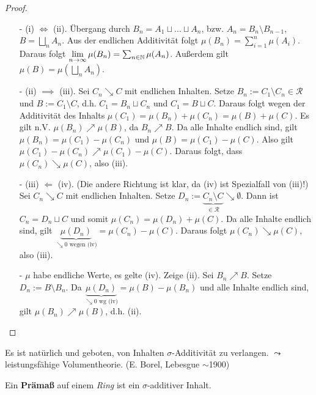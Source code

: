 \begin{proposition}
\begin{proof}
\begin{enumerate}[(\roman*),topsep=5pt, itemsep = 0 pt]
	\item[-] (i) $\iff$ (ii). Übergang durch $B_n = A_1 \sqcup ... \sqcup A_n$, bzw. $A_n = B_n \setminus B_{n-1}$, $B = \bigsqcup_n A_n$. Aus der endlichen Additivität folgt $\mu (B_n) = \sum_{i=1}^n \mu(A_i)$. Daraus folgt $\lim\limits_{n \to \infty} \mu (B_n) = \sum_{n \in \mathbb{N}} \mu (A_n)$. Außerdem gilt $\mu(B) = \mu (\bigsqcup_n A_n)$. \checkmark
	\item[-] (ii) $\implies$ (iii). Sei $C_n \searrow C$ mit endlichen Inhalten. Setze $B_n := C_1 \setminus C_n \in \mathcal{R}$ und $B := C_1 \setminus C$, d.h. $C_1 = B_n \sqcup C_n$ und $C_1 = B \sqcup C$. Daraus folgt wegen der Additivität des Inhalts $\mu(C_1) = \mu (B_n) + \mu(C_n)=\mu(B) + \mu (C)$. Es gilt n.V. $\mu(B_n) \nearrow \mu (B)$, da $B_n \nearrow B$. Da alle Inhalte endlich sind, gilt
		$\mu (B_n) = \mu(C_1) - \mu (C_n)$ und
		$\mu (B) = \mu(C_1) - \mu (C)$. Also gilt $\mu(C_1) - \mu (C_n) \nearrow \mu(C_1) - \mu (C)$.
	Daraus folgt, dass $\mu(C_n) \searrow \mu(C)$, also (iii).
	\item[-] (iii) $\Longleftarrow$ (iv).  (Die andere Richtung ist klar, da (iv) ist Spezialfall von (iii)!) \newline
	Sei $C_n \searrow C$ mit endlichen Inhalten. Setze $D_n := \underbrace{C_n \setminus C}_{\in \mathcal{R}} \searrow \emptyset$. Dann ist $C_n = D_n \sqcup C$ und somit $\mu(C_n) = \mu(D_n) + \mu(C)$. Da alle Inhalte endlich sind, gilt $\underbrace{\mu(D_n)}_{\searrow 0 \text{ wegen (iv)}} = \mu(C_n) -\mu (C)$. Daraus folgt $\mu(C_n) \searrow \mu (C)$, also (iii).
	\item[-] $\mu$ habe endliche Werte, es gelte (iv). Zeige (ii). Sei $B_n \nearrow B$. Setze $D_n:=B \setminus B_n$. Da $\underbrace{\mu(D_n)}_{\searrow 0 \text{ wg (iv)}} = \mu(B) - \mu (B_n)$ und alle Inhalte endlich sind, gilt $\mu(B_n) \nearrow \mu(B)$, d.h. (ii).
\end{enumerate}
\end{proof}
\end{proposition}


Es ist natürlich und geboten, von Inhalten $\sigma$-Additivität zu verlangen. $\leadsto$ leistungsfähige Volumentheorie. (E. Borel, Lebesgue $\sim$1900)

\begin{definition}
\begin{mdframed}
Ein \textbf{Prämaß} auf einem \emph{Ring} ist ein $\sigma$-additiver Inhalt.
\end{mdframed}
\end{definition}


